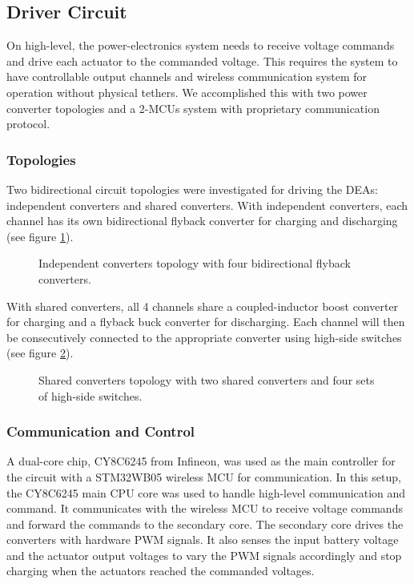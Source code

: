 \documentclass[../main.tex]{subfiles}
\begin{document}
\subsection{Driver Circuit}
On high-level, the power-electronics system needs to receive voltage commands and drive each actuator to the commanded voltage. This requires the system to have controllable output channels and wireless communication system for operation without physical tethers. We accomplished this with two power converter topologies and a 2-MCUs system with proprietary communication protocol.

\subsubsection{Topologies}
Two bidirectional circuit topologies were investigated for driving the DEAs: independent converters and shared converters. With independent converters, each channel has its own bidirectional flyback converter for charging and discharging (see figure \ref{fig:independent-converter}).

\begin{figure}[!htb]
    \centering
    
    \caption{Independent converters topology with four bidirectional flyback converters.}
    \label{fig:independent-converter}
\end{figure}

With shared converters, all 4 channels share a coupled-inductor boost converter for charging and a flyback buck converter for discharging. Each channel will then be consecutively connected to the appropriate converter using high-side switches (see figure \ref{fig:shared-converter}).

\begin{figure}[!htb]
    \centering
    
    \caption{Shared converters topology with two shared converters and four sets of high-side switches.}
    \label{fig:shared-converter}
\end{figure}


\subsubsection{Communication and Control}
A dual-core chip, CY8C6245 from Infineon, was used as the main controller for the circuit with a STM32WB05 wireless MCU for communication. In this setup, the CY8C6245 main CPU core was used to handle high-level communication and command. It communicates with the wireless MCU to receive voltage commands and forward the commands to the secondary core. The secondary core drives the converters with hardware PWM signals. It also senses the input battery voltage and the actuator output voltages to vary the PWM signals accordingly and stop charging when the actuators reached the commanded voltages.
\end{document}
